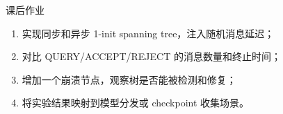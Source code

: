 \documentclass[UTF8,fontset=none,aspectratio=169,10pt]{beamer}
\begin{document}
\begin{frame}{课后作业}
\begin{enumerate}
  \item 实现同步和异步 1-init spanning tree，注入随机消息延迟；
  \item 对比 QUERY/ACCEPT/REJECT 的消息数量和终止时间；
  \item 增加一个崩溃节点，观察树是否能被检测和修复；
  \item 将实验结果映射到模型分发或 checkpoint 收集场景。
\end{enumerate}
\vfill
{}
\end{frame}
\end{document}

